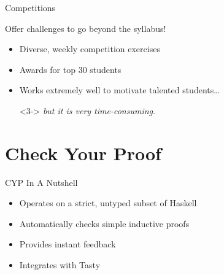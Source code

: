 \documentclass{beamer}
\begin{document}
\begin{frame}[fragile]{Competitions}
\centerline{\Large{\alert{Offer challenges to go beyond the syllabus!}}}
\begin{itemize}
\item Diverse, weekly competition exercises
\item Awards for top 30 students
\item<2-> Works extremely well to motivate talented students\dots
\item[]<3-> \emph{but it is very time-consuming}.
\end{itemize}
\end{frame}



\section{Check Your Proof}

\begin{frame}{CYP In A Nutshell}

\begin{itemize}[<+->]
  \item Operates on a strict, untyped subset of Haskell
  \item Automatically checks simple inductive proofs
  \item Provides instant feedback
  \item Integrates with Tasty
\end{itemize}
\end{frame}
\end{document}
